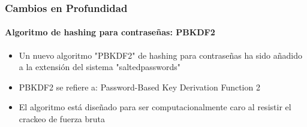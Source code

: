 \begin{frame}[fragile]
	\frametitle{Cambios en Profundidad}
	\framesubtitle{Algoritmo de hashing para contraseñas: PBKDF2}

	\begin{itemize}

		\item Un nuevo algoritmo "PBKDF2" de hashing para contraseñas ha sido añadido a la extensión del sistema "saltedpasswords"

		\item PBKDF2 se refiere a: Password-Based Key Derivation Function 2

		\item El algoritmo está diseñado para ser computacionalmente caro al resistir el crackeo de fuerza bruta

	\end{itemize}

\end{frame}

